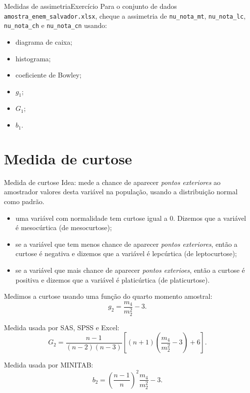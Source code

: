 \documentclass[
  10pt,
  ignorenonframetext,
]{beamer}
\providecommand{\tightlist}{%
  \setlength{\itemsep}{0pt}\setlength{\parskip}{0pt}}\usepackage{longtable,booktabs,array}
\begin{document}
\begin{frame}[fragile]{Medidas de assimetria\newline Exercício}
\protect\hypertarget{medidas-de-assimetriaexercuxedcio}{}
Para o conjunto de dados \texttt{amostra\_enem\_salvador.xlsx}, cheque a
assimetria de \texttt{nu\_nota\_mt}, \texttt{nu\_nota\_lc},
\texttt{nu\_nota\_ch} e \texttt{nu\_nota\_cn} usando:

\begin{itemize}
\tightlist
\item
  diagrama de caixa;
\item
  histograma;
\item
  coeficiente de Bowley;
\item
  \(g_1\);
\item
  \(G_1\);
\item
  \(b_1\).
\end{itemize}
\end{frame}

\hypertarget{medida-de-curtose}{%
\section{Medida de curtose}\label{medida-de-curtose}}

\begin{frame}{Medida de curtose}
\protect\hypertarget{medida-de-curtose-1}{}
Idea: mede a chance de aparecer \emph{pontos exteriores} ao amostrador
valores desta variável na população, usando a distribuição normal como
padrão.

\begin{itemize}
\tightlist
\item
  uma variável com normalidade tem curtose igual a 0. Dizemos que a
  variável é mesocúrtica (de mesocurtose);
\item
  se a variável que tem menos chance de aparecer \emph{pontos
  exteriores}, então a curtose é negativa e dizemos que a variável é
  lepcúrtica (de leptocurtose);
\item
  se a variável que mais chance de aparecer \emph{pontos exterioes},
  então a curtose é positiva e dizemos que a variável é platicúrtica (de
  platicurtose).
\end{itemize}

Medimos a curtose usando uma função do quarto momento amostral: \[
g_2 = \frac{m_4}{m_2^2} - 3.
\]
\end{frame}

\begin{frame}
Medida usada por SAS, SPSS e Excel: \[
G_2 = \frac{n-1}{(n-2)(n-3)}\left[ (n+1) \left(\frac{m_4}{m_2^2}-3\right) +6  \right].
\]

Medida usada por MINITAB: \[
b_2 = \left( \frac{n-1}{n} \right)^2 \frac{m_4}{m_2^2}-3.
\]
\end{frame}
\end{document}
